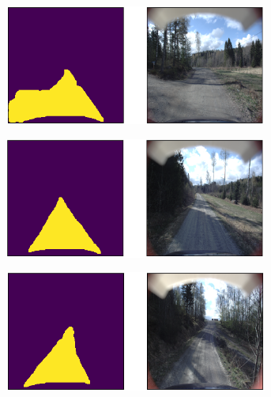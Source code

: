 \documentclass[USenglish]{ifimaster}  %
\begin{document}
\begin{appendices}
\begin{figure}[ht]
\centering
\begin{subfigure}[b]{\textwidth}
\centering
\includegraphics[width=0.95\textwidth]{bilder/appendix_2/1214.png}
\end{subfigure}
\hfill
\begin{subfigure}[b]{\textwidth}
\centering
\includegraphics[width=0.95\textwidth]{bilder/appendix_2/1299.png}
\end{subfigure}
\hfill
\begin{subfigure}[b]{\textwidth}
\centering
\includegraphics[width=0.95\textwidth]{bilder/appendix_2/1587.png}
\end{subfigure}
\end{figure}


\end{appendices}

\backmatter{}
\end{document}
